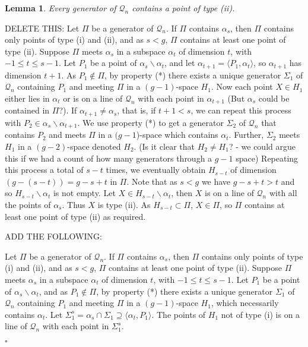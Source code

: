 \documentclass[12pt]{article}
\newtheorem{lemma}[theorem]{Lemma}
\newenvironment{proof}{\noindent{\bf Proof}\hspace{0.5em}}
    { \null  \hfill $\square$ \par}
\newcommand{\Q}{\mathscr Q}
\newcommand{\Label}{\label}
\newcommand\TODO[1]{{\color{Purple} #1}}
\newcommand\red[1]{{\color{red} #1}}
\newcommand\blue[1]{{\color{blue} #1}}
\begin{document}
\begin{lemma}\Label{lem-1-type-ii} Every generator of $\Q_n$ contains a point of type (ii).
\end{lemma}
\begin{proof}
\blue{DELETE THIS:
  Let $\Pi$ be a generator of $\Q_n$. If $\Pi$ contains $\alpha_s$, then $\Pi$ contains only points of type (i) and (ii), \TODO{and as $s<g$, } $\Pi$ contains at least one point of type (ii). 
Suppose $\Pi$ meets $\alpha_s$ in a subspace $\alpha_t$ of dimension $t$,  with $-1\le t\le s-1$.  Let $P_1$ be a point of $\alpha_s\backslash\alpha_t$, and let $\alpha_{t+1}=\langle P_1,\alpha_t\rangle$, so $\alpha_{t+1}$ has dimension $t+1$. As  $P_1\notin\Pi$, by property (*) there exists a unique generator $\Sigma_1$ of $\Q_n$ containing $P_1$ and meeting $\Pi$ in a $(g-1)$-space $H_1$.  Now each point  $X\in H_1$ either lies in $\alpha_t$ or is on a line of $\Q_n$ with each point in  $\alpha_{t+1}$ \TODO{(But $\alpha_s$ could be contained in $\Pi$?)}.  If $\alpha_{t+1}\neq\alpha_s$, that is, if $t+1<s$, we can repeat this process with $P_2\in\alpha_s\backslash\alpha_{t+1}$. We use property (*) to get a generator  $\Sigma_2$ of $\Q_n$ that contains $P_2$ and meets $\Pi$ in a $(g-1$)-space which contains $\alpha_{t}$. Further, $\Sigma_2$ meets $H_1$ in a $(g-2)$-space denoted $H_2$. \TODO{(Is it clear that $H_2\ne H_1$? - we could argue this if we had a count of how many generators through a $g-1$ space)} Repeating this process a total of $s-t$ times, we eventually obtain $H_{s-t}$ of dimension $(g-(s-t))=g-s+t$ in $\Pi$.  Note that as $s<g$ we have $g-s+t>t$ and so $H_{s-t}\backslash\alpha_t$ is not empty. Let $X\in H_{s-t}\backslash\alpha_t$, then $X$ 
 is on a line of $\Q_n$ with all the points of $\alpha_s$. Thus $X$ is type (ii). As $H_{s-t}\subset\Pi$, $X\in\Pi$, so $\Pi$ contains at least one point of type (ii) as required.

ADD THE FOLLOWING:}


\red{
 Let $\Pi$ be a generator of $\Q_n$. If $\Pi$ contains $\alpha_s$, then $\Pi$ contains only points of type (i) and (ii), and as $s<g$, $\Pi$ contains at least one point of type (ii). 
Suppose $\Pi$ meets $\alpha_s$ in a subspace $\alpha_t$ of dimension $t$,  with $-1\le t\le s-1$.  Let $P_1$ be a point of $\alpha_s\backslash\alpha_t$, and as  $P_1\notin\Pi$, by property (*) there exists a unique generator $\Sigma_1$ of $\Q_n$ containing $P_1$ and meeting $\Pi$ in a $(g-1)$-space $H_1$, which necessarily contains $\alpha_t$.  Let $\Sigma_1^s=\alpha_s\cap\Sigma_1\supseteq \langle\alpha_t,P_1\rangle$. The points of   $H_1$ not of type (i) is on a line of $\Q_n$ with each point in  $\Sigma_1^s$.  

}
\end{proof}
\end{document}
